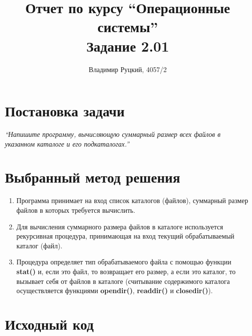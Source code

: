 \documentclass[a4paper,12pt]{article}
\title{Отчет по курсу ``Операционные системы'' \\ Задание 2.01}
\author{Владимир Руцкий, 4057/2}
\newcommand{\commandquote}[1]{\textbf{#1}}
\begin{document}
\maketitle

\section*{Постановка задачи}
\textit{``Напишите программу, вычисляющую суммарный размер всех файлов в указанном
каталоге и его подкаталогах.''}

\section*{Выбранный метод решения}
\begin{enumerate}
 \item Программа принимает на вход список каталогов (файлов),
суммарный размер файлов в которых требуется вычислить.
 \item Для вычисления суммарного размера файлов в каталоге используется рекурсивная процедура,
принимающая на вход текущий обрабатываемый каталог (файл).
 \item Процедура определяет тип обрабатываемого файла с помощью функции \commandquote{stat()} и, 
если это файл, то возвращает его размер,
а если это каталог, то вызывает себя от файлов в каталоге 
(считывание содержимого каталога осуществляется функциями \commandquote{opendir()}, 
\commandquote{readdir()} и \commandquote{closedir()}).
\end{enumerate}

\section*{Исходный код}
\lstset{language=bash, caption=task\_2\_01.c,%
label=source-code, basicstyle=\footnotesize,%
numbers=left, numberstyle=\footnotesize, numbersep=5pt, frame=single, breaklines=true, breakatwhitespace=false,%
inputencoding=utf8x}

\end{document}
